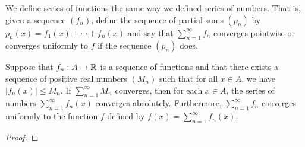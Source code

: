 \documentclass[../main.tex]{subfiles}
\begin{document}
\begin{definition}\label{dfn:17.10}
    We define series of functions the same way we defined series of numbers. That is, given a sequence $(f_n)$, define the sequence of partial sums $(p_n)$ by $p_n(x)=f_1(x)+\cdots+f_n(x)$ and say that $\sum_{n=1}^\infty f_n$ converges pointwise or converges uniformly to $f$ if the sequence $(p_n)$ does.
\end{definition}

\begin{theorem}\label{trm:17.11}
    Suppose that $f_n:A\to\mathbb{R}$ is a sequence of functions and that there exists a sequence of positive real numbers $(M_n)$ such that for all $x\in A$, we have $|f_n(x)|\leq M_n$. If $\sum_{n=1}^\infty M_n$ converges, then for each $x\in A$, the series of numbers $\sum_{n=1}^\infty f_n(x)$ converges absolutely. Furthermore, $\sum_{n=1}^\infty f_n$ converges uniformly to the function $f$ defined by $f(x)=\sum_{n=1}^\infty f_n(x)$.
    \begin{proof}

\end{proof}
\end{theorem}
\end{document}
